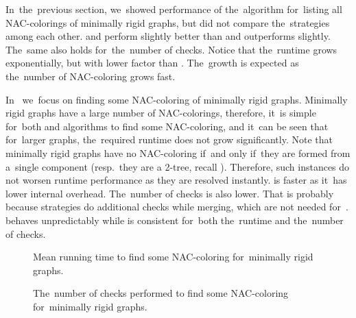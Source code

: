 In~the~previous section, we~showed performance of the~algorithm for~listing
all NAC-colorings of minimally rigid graphs,
but did not compare the~strategies among each other.
%
\Neighbors{} and \NeighborsDegree{} perform slightly better than \None{} and
\SharedVertices{} outperforms \MergeLinear{} slightly.
The~same also holds for~the~number of \IsNACColoring{} checks.
Notice that the~runtime grows exponentially, but with lower factor than \NaiveCycles{}.
The~growth is expected as the~number of NAC-coloring grows fast.

In~
we~focus on finding some NAC-coloring of minimally rigid graphs.
%
Minimally rigid graphs have a large number of NAC-colorings,
therefore, it~is simple for~both \NaiveCycles{}
and \Subgraphs{} algorithms to find some NAC-coloring,
and it~can be seen that for~larger graphs, the~required runtime
does not grow significantly.
%
Note that minimally rigid graphs have no NAC-coloring if~and only if~they are formed from
a~single \trcon{} component (resp.\ they are a 2-tree, recall ).
Therefore, such instances do not worsen runtime performance as they are resolved instantly.
%
\NaiveCycles{} is faster as it~has lower internal overhead.
The~number of \IsNACColoring{} checks is also lower.
That is probably because \Subgraphs{} strategies do additional checks
while merging, which are not needed for~\NaiveCycles{}.
\SharedVertices{} behaves unpredictably while \MergeLinear{} is consistent
for~both the~runtime and the~number of \IsNACColoring{} checks.

\begin{figure}[thbp]
	\centering
	\scalebox{\BenchFigureScale}{}
	\caption[Mean runtime for~minimally rigid graphs (some)]{
		Mean running time to find some NAC-coloring for~minimally rigid graphs.}%
	\label{fig:graph_minimally_rigid_first_runtime}
\end{figure}%
\begin{figure}[thbp]
	\centering
	\scalebox{\BenchFigureScale}{}
	\caption[Checks performed for~minimally rigid graphs (some)]{
		The~number of checks performed to find some NAC-coloring for~minimally rigid graphs.}%
	\label{fig:graph_minimally_rigid_first_checks}
\end{figure}%



